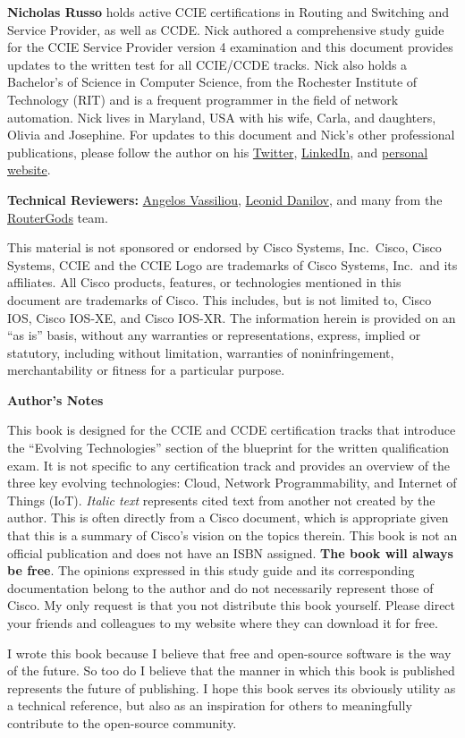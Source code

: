 \noindent
\textbf{Nicholas Russo} holds active CCIE certifications in Routing and
Switching and Service Provider, as well as CCDE\@. Nick authored a comprehensive
study guide for the CCIE Service Provider version 4 examination and this
document provides updates to the written test for all CCIE/CCDE tracks. Nick
also holds a Bachelor’s of Science in Computer Science, from the Rochester
Institute of Technology (RIT) and is a frequent programmer in the field of
network automation. Nick lives in Maryland, USA with his wife, Carla, and
daughters, Olivia and Josephine. For updates to this document and Nick’s other
professional publications, please follow the author on his
\href{https://twitter.com/nickrusso42518}{Twitter},
\href{https://www.linkedin.com/in/njrusmc}{LinkedIn}, and
\href{http://njrusmc.net}{personal website}.


\textbf{Technical Reviewers:}
\href{https://twitter.com/ipmess}{Angelos Vassiliou},
\href{https://twitter.com/iosxrqna}{Leonid Danilov}, and many from the
\href{https://www.meetup.com/routergods}{RouterGods} team.

This material is not sponsored or endorsed by Cisco Systems, Inc.\ Cisco, Cisco
Systems, CCIE and the CCIE Logo are trademarks of Cisco Systems, Inc.\ and its
affiliates. All Cisco products, features, or technologies mentioned in this
document are trademarks of Cisco. This includes, but is not limited to, Cisco
IOS, Cisco IOS-XE, and Cisco IOS-XR\@. The information herein is provided on an
``as is'' basis, without any warranties or representations, express, implied or
statutory, including without limitation, warranties of noninfringement,
merchantability or fitness for a particular purpose.

\textbf{Author’s Notes}

This book is designed for the CCIE and CCDE certification tracks that
introduce the ``Evolving Technologies'' section of the blueprint for the written
qualification exam. It is not specific to any certification track and provides
an overview of the three key evolving technologies: Cloud, Network
Programmability, and Internet of Things (IoT). \textit{Italic text} represents
cited text from another not created by the author. This is often directly
from a Cisco document, which is appropriate given that this is a summary of
Cisco’s vision on the topics therein. This book is not an official
publication and does not have an ISBN assigned. \textbf{The book will always be free}.
The opinions expressed in this study guide and its corresponding documentation
belong to the author and do not necessarily represent those of Cisco. My only
request is that you not distribute this book yourself. Please direct your
friends and colleagues to my website where they can download it for free.

I wrote this book because I believe that free and open-source software is the
way of the future. So too do I believe that the manner in which this book is
published represents the future of publishing. I hope this book serves its
obviously utility as a technical reference, but also as an inspiration for
others to meaningfully contribute to the open-source community.

